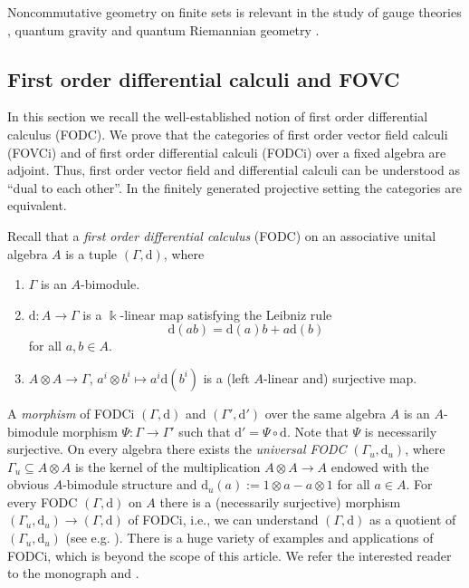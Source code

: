 \documentclass{article}
\theoremstyle{definition}
\begin{document}
	Noncommutative geometry on finite sets is relevant in the study of gauge theories \cite{DimMul,MajSim}, quantum gravity \cite{Cas} and quantum Riemannian geometry \cite[Chapter 8.2.2]{bm}.
	
	\subsection{First order differential calculi and FOVC}\label{sec:FODC}
	
	
	In this section we recall the well-established notion of first order differential calculus (FODC). We prove that the categories of first order vector field calculi (FOVCi) and of first order differential calculi (FODCi) over a fixed algebra are adjoint. Thus, first order vector field and differential calculi can be understood as ``dual to each other''.
	In the finitely generated projective setting the categories are equivalent.
	
	Recall that a  \textit{first order differential calculus} (FODC) \cite{Woronowicz1989} on an associative unital algebra $A$ is a tuple $(\Gamma,\mathrm{d})$, where
	\begin{enumerate}
		\item[i.)] $\Gamma$ is an $A$-bimodule.
		
		\item[ii.)] $\mathrm{d}\colon A\to\Gamma$ is a $\Bbbk$-linear map satisfying the Leibniz rule
		$$
		\mathrm{d}(ab)=\mathrm{d}(a)b+a\mathrm{d}(b)
		$$
		for all $a,b\in A$.
		
		\item[iii.)] $A\otimes A\to\Gamma$, $a^i\otimes b^i\mapsto a^i\mathrm{d}(b^i)$ is a (left $A$-linear and) surjective map.
	\end{enumerate}
	A \textit{morphism} of FODCi $(\Gamma,\mathrm{d})$ and $(\Gamma',\mathrm{d}')$ over the same algebra $A$ is an $A$-bimodule morphism $\Psi\colon\Gamma\to\Gamma'$ such that $\mathrm{d}'=\Psi\circ\mathrm{d}$. Note that $\Psi$ is necessarily surjective. On every algebra there exists the \textit{universal FODC} $(\Gamma_u,\mathrm{d}_u)$, where $\Gamma_u\subseteq A\otimes A$ is the kernel of the multiplication $A\otimes A\to A$ endowed with the obvious $A$-bimodule structure and $\mathrm{d}_u(a):=1\otimes a-a\otimes 1$ for all $a\in A$. For every FODC $(\Gamma,\mathrm{d})$ on $A$ there is a (necessarily surjective) morphism $(\Gamma_u,\mathrm{d}_u)\to(\Gamma,\mathrm{d})$ of FODCi, i.e., we can understand $(\Gamma,\mathrm{d})$ as a quotient of $(\Gamma_u,\mathrm{d}_u)$ (see e.g. \cite[Appendix A]{DurI}). There is a huge variety of examples and applications of FODCi, which is beyond the scope of this article. We refer the interested reader to the monograph \cite{bm} and \cite{DurII,SchDC}.
	
\end{document}
